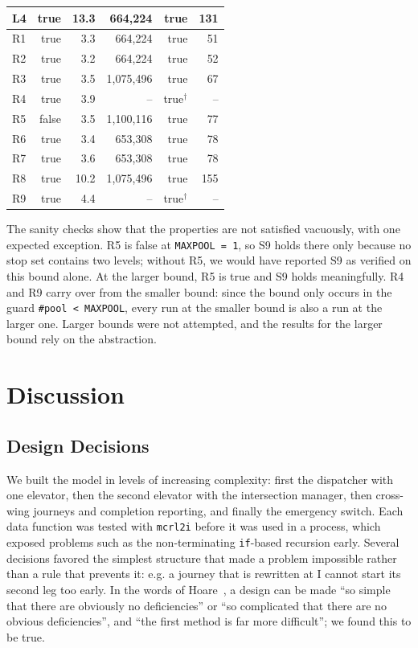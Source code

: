 \begin{longtable}{@{}lrrrrr@{}}
  L4 & true & 13.3 & 664,224 & true & 131\\
  \midrule
  R1 & true & 3.3 & 664,224 & true & 51\\
  R2 & true & 3.2 & 664,224 & true & 52\\
  R3 & true & 3.5 & 1,075,496 & true & 67\\
  R4 & true & 3.9 & -- & true\(^{\dagger}\) & --\\
  R5 & false & 3.5 & 1,100,116 & true & 77\\
  R6 & true & 3.4 & 653,308 & true & 78\\
  R7 & true & 3.6 & 653,308 & true & 78\\
  R8 & true & 10.2 & 1,075,496 & true & 155\\
  R9 & true & 4.4 & -- & true\(^{\dagger}\) & --\\
\end{longtable}
\endgroup
{}

The sanity checks show that the properties are not satisfied vacuously, with one expected exception. R5 is false at \texttt{MAXPOOL = 1}, so S9 holds there only because no stop set contains two levels; without R5, we would have reported S9 as verified on this bound alone. At the larger bound, R5 is true and S9 holds meaningfully. R4 and R9 carry over from the smaller bound: since the bound only occurs in the guard \texttt{\#pool < MAXPOOL}, every run at the smaller bound is also a run at the larger one. Larger bounds were not attempted, and the results for the larger bound rely on the abstraction.

\section{Discussion}
\label{sec:discussion}

\subsection{Design Decisions}
\label{subsec:design-decisions}

We built the model in levels of increasing complexity: first the dispatcher with one elevator, then the second elevator with the intersection manager, then cross-wing journeys and completion reporting, and finally the emergency switch. Each data function was tested with \texttt{mcrl2i} before it was used in a process, which exposed problems such as the non-terminating \texttt{if}-based recursion early. Several decisions favored the simplest structure that made a problem impossible rather than a rule that prevents it: e.g. a journey that is rewritten at I cannot start its second leg too early. In the words of Hoare~\cite{hoare1981emperor}, a design can be made ``so simple that there are obviously no deficiencies'' or ``so complicated that there are no obvious deficiencies'', and ``the first method is far more difficult''; we found this to be true.


